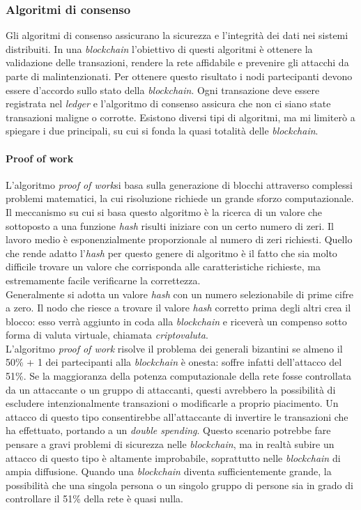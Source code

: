 \subsubsection{Algoritmi di consenso}
Gli algoritmi di consenso assicurano la sicurezza e l'integrità dei dati nei sistemi distribuiti. In una \textit{blockchain} l'obiettivo di questi algoritmi è ottenere la validazione delle transazioni, rendere la rete affidabile e prevenire gli attacchi da parte di malintenzionati.
Per ottenere questo risultato i nodi partecipanti devono essere d'accordo sullo stato della \textit{blockchain}. Ogni transazione deve essere registrata nel \textit{ledger} e l’algoritmo di consenso assicura che non ci siano state transazioni maligne o corrotte.
Esistono diversi tipi di algoritmi, ma mi limiterò a spiegare i due principali, su cui si fonda la quasi totalità delle \textit{blockchain}.\\

\paragraph{Proof of work}
L’algoritmo \emph{\gls{proof of work}}\glsfirstoccur si basa sulla generazione di blocchi attraverso complessi problemi matematici, la cui risoluzione richiede un grande sforzo computazionale.
Il meccanismo su cui si basa questo algoritmo è la ricerca di un valore che sottoposto a una funzione \textit{hash} risulti iniziare con un certo numero di zeri. Il lavoro medio è esponenzialmente proporzionale al numero di zeri richiesti. Quello che rende adatto l'\textit{hash} per questo genere di algoritmo è il fatto che sia molto difficile trovare un valore che corrisponda alle caratteristiche richieste, ma estremamente facile verificarne la correttezza.\\ 
Generalmente si adotta un valore \textit{hash} con un numero selezionabile di prime cifre a zero. Il nodo che riesce a trovare il valore \textit{hash} corretto prima degli altri crea il blocco: esso verrà aggiunto in coda alla \textit{blockchain} e riceverà un compenso sotto forma di valuta virtuale, chiamata \emph{\gls{criptovaluta}}\glsfirstoccur.\\ L’algoritmo \textit{proof of work} risolve il problema dei generali bizantini se almeno il 50\% + 1 dei partecipanti alla \textit{blockchain} è onesta: soffre infatti dell'attacco del 51\%.  Se la maggioranza della potenza computazionale della rete fosse controllata da un attaccante o un gruppo di attaccanti, questi avrebbero la possibilità di escludere intenzionalmente transazioni o modificarle a proprio piacimento. Un attacco di questo tipo consentirebbe all'attaccante di invertire le transazioni che ha effettuato, portando a un \emph{\gls{double spending}}\glsfirstoccur. Questo scenario potrebbe fare pensare a gravi problemi di sicurezza nelle \textit{blockchain}, ma in realtà subire un attacco di questo tipo è altamente improbabile, soprattutto nelle \textit{blockchain} di ampia diffusione. Quando una \textit{blockchain} diventa sufficientemente grande, la possibilità che una singola persona o un singolo gruppo di persone sia in grado di controllare il 51\% della rete è quasi nulla.

